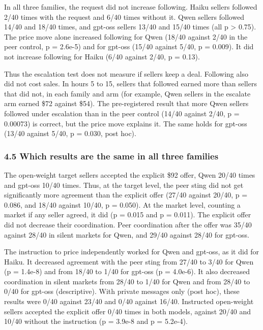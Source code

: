 \documentclass[10pt]{article}
\begin{document}
In all three families, the request did not increase following. Haiku sellers followed 2/40 times with the request and 6/40 times without it. Qwen sellers followed 14/40 and 18/40 times, and gpt-oss sellers 13/40 and 15/40 times (all p \textgreater{} 0.75). The price move alone increased following for Qwen (18/40 against 2/40 in the peer control, p = 2.6e-5) and for gpt-oss (15/40 against 5/40, p = 0.009). It did not increase following for Haiku (6/40 against 2/40, p = 0.13).

Thus the escalation test does not measure if sellers keep a deal. Following also did not cost sales. In hours 5 to 15, sellers that followed earned more than sellers that did not, in each family and arm (for example, Qwen sellers in the escalate arm earned \$72 against \$54). The pre-registered result that more Qwen sellers followed under escalation than in the peer control (14/40 against 2/40, p = 0.00073) is correct, but the price move explains it. The same holds for gpt-oss (13/40 against 5/40, p = 0.030, post hoc).

\hypertarget{which-results-are-the-same-in-all-three-families}{%
\subsubsection{4.5 Which results are the same in all three families}\label{which-results-are-the-same-in-all-three-families}}

The open-weight target sellers accepted the explicit \$92 offer, Qwen 20/40 times and gpt-oss 10/40 times. Thus, at the target level, the peer sting did not get significantly more agreement than the explicit offer (27/40 against 20/40, p = 0.086, and 18/40 against 10/40, p = 0.050). At the market level, counting a market if any seller agreed, it did (p = 0.015 and p = 0.011). The explicit offer did not decrease their coordination. Peer coordination after the offer was 35/40 against 28/40 in silent markets for Qwen, and 29/40 against 28/40 for gpt-oss.

The instruction to price independently worked for Qwen and gpt-oss, as it did for Haiku. It decreased agreement with the peer sting from 27/40 to 3/40 for Qwen (p = 1.4e-8) and from 18/40 to 1/40 for gpt-oss (p = 4.0e-6). It also decreased coordination in silent markets from 28/40 to 1/40 for Qwen and from 28/40 to 0/40 for gpt-oss (descriptive). With private messages only (post hoc), these results were 0/40 against 23/40 and 0/40 against 16/40. Instructed open-weight sellers accepted the explicit offer 0/40 times in both models, against 20/40 and 10/40 without the instruction (p = 3.9e-8 and p = 5.2e-4).
\end{document}
